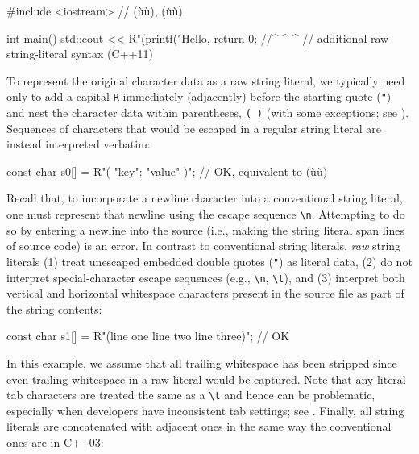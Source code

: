 \begin{emcppslisting}
#include <iostream>  // (ù{}ù), (ù{}ù)

int main()
{
    std::cout << R"(printf("Hello, %
    return 0;  //^ ^                                      ^
               //   additional raw string-literal syntax (C++11)
}
\end{emcppslisting}

\noindent To represent the original character
data as a raw string literal, we typically need only to add a capital \lstinline!R! immediately
(adjacently) before the starting quote (\lstinline!"!) and nest the
character data within parentheses, \lstinline!(!~\lstinline!)! (with some exceptions; see ).
Sequences of
characters that would be escaped in a regular string literal are instead
interpreted verbatim:

\begin{emcppslisting}
const char s0[] = R"({ "key": "value" })";
    // OK, equivalent to (ù{}ù)
\end{emcppslisting}

\noindent Recall that, to incorporate a newline character into a conventional string literal, one must represent that newline using the escape sequence \lstinline!\n!.  Attempting to do so by entering a newline into the source (i.e., making the string literal span lines of source code) is an error. In contrast to conventional string literals, \emph{raw} string literals
(1) treat unescaped embedded double quotes (\lstinline!"!) as literal data,
(2) do not interpret special-character escape sequences (e.g.,
\lstinline!\n!, \lstinline!\t!), and (3) interpret both vertical and horizontal
whitespace characters present in
the source file as part of the string contents:


\begin{emcppslisting}
const char s1[] = R"(line one
line two
    line three)";
    // OK
\end{emcppslisting}

\noindent In
this example, we assume that all trailing whitespace has been stripped
since even trailing whitespace in a raw literal would be captured. Note that any literal tab characters are treated the same as a
\lstinline!\t! and hence can be problematic, especially when
developers have inconsistent tab settings; see .
Finally, all string literals are concatenated with
adjacent ones in the same way the conventional ones are in C++03:


